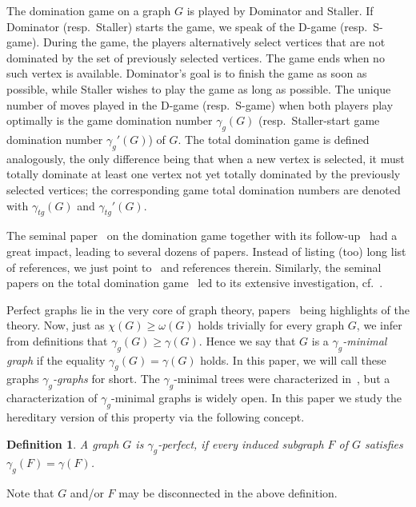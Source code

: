 \documentclass[12pt]{article}
\newtheorem{definition}[theorem]{Definition}
\begin{document}
The domination game on a graph $G$ is played by Dominator and Staller. If Dominator (resp.\ Staller) starts the game, we speak of the D-game (resp.\ S-game). During the game, the players alternatively select vertices that are not dominated by the set of previously selected vertices. The game ends when no such vertex is available. Dominator's goal is to finish the game as soon as possible, while Staller wishes to play the game as long as possible. The unique number of moves played in the D-game (resp.\ S-game) when both players play optimally is the game domination number $\gamma_g(G)$ (resp.\ Staller-start game domination number $\gamma_g'(G)$) of $G$. The total domination game is defined analogously, the only difference being that when a new vertex is selected, it must totally dominate at least one vertex not yet totally dominated by the previously selected vertices; the corresponding game total domination numbers are denoted with $\gamma_{tg}(G)$ and $\gamma_{tg}'(G)$.   

The seminal paper~\cite{bresar-2010} on the domination game together with its follow-up~\cite{kinnersley-2013} had a great impact, leading to several dozens of papers. Instead of listing (too) long list of references, we just point to~\cite{dorbec-2015, james-2019, klavzar-2019, xu-2018} and references therein. Similarly, the seminal papers on the total domination game~\cite{henning-2015, henning-2017} led to its extensive investigation, cf.~\cite{bujtas-2018, bujtas-2016, henning-2018}. 

Perfect graphs lie in the very core of graph theory, papers~\cite{chudnovsky-2006, lovasz-1972} being highlights of the theory. Now, just as $\chi(G)\ge \omega(G)$ holds trivially for every graph $G$, we infer from definitions that $\gamma_g(G)\ge \gamma(G)$. Hence we say that $G$ is a \emph{$\gamma_g$-minimal graph} if the equality $\gamma_g(G)=\gamma(G)$ holds. In this paper, we will call these graphs \emph{$\gamma_g$-graphs} for short. The $\gamma_g$-minimal trees were characterized in~\cite{nadjafi-2016}, but a characterization of $\gamma_g$-minimal graphs is widely open. In this paper we study the hereditary version of this property via the following concept.  

\begin{definition}
A graph $G$ is \emph{$\gamma_g$-perfect}, if every induced subgraph $F$ of $G$ satisfies $\gamma_g(F)=\gamma(F)$.
\end{definition}
Note that $G$ and/or $F$ may be disconnected in the above definition.
\end{document}
